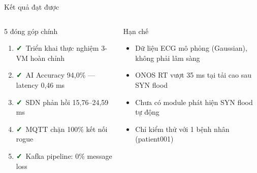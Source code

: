 \documentclass[aspectratio=169, 12pt]{beamer}
\newcommand{\cmark}{\textcolor{darkgreen}{\textbf{✓}}}
\begin{document}
\begin{frame}{Kết quả đạt được}

\begin{columns}[T]
\begin{exampleblock}{5 đóng góp chính}
\begin{enumerate}
  \item \cmark\ Triển khai thực nghiệm 3-VM hoàn chỉnh
  \item \cmark\ AI Accuracy 94,0\% — latency 0,46 ms
  \item \cmark\ SDN phản hồi 15,76–24,59 ms
  \item \cmark\ MQTT chặn 100\% kết nối rogue
  \item \cmark\ Kafka pipeline: 0\% message loss
\end{enumerate}
\end{exampleblock}

\begin{alertblock}{Hạn chế}
\begin{itemize}
  \item Dữ liệu ECG mô phỏng (Gaussian), không phải lâm sàng
  \item ONOS RT vượt 35 ms tại tải cao sau SYN flood
  \item Chưa có module phát hiện SYN flood tự động
  \item Chỉ kiểm thử với 1 bệnh nhân (patient001)
\end{itemize}
\end{alertblock}
\end{columns}

\end{frame}
\end{document}

